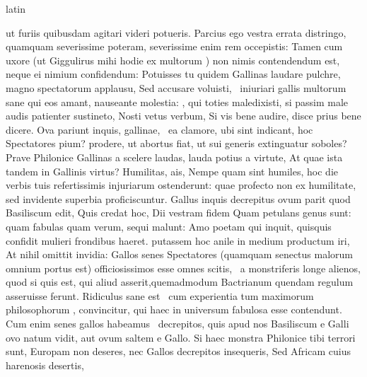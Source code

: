 \documentclass[12pt]{book}
\renewenvironment{latin}
    	{\begin{hyphenrules}{latin}}
    	{\end{hyphenrules}}
\begin{document}
\begin{pages}
\begin{latin}
\begin{Leftside}
                  ut furiis quibusdam agitari videri potueris. Parcius ego vestra errata distringo, quamquam severissime poteram, severissime enim rem occepistis: Tamen cum uxore (ut Giggulirus mihi
                  hodie ex multorum ) non nimis contendendum est, 
                  neque ei nimium confidendum: Potuisses tu quidem Gallinas laudare pulchre, magno spectatorum applausu, Sed accusare voluisti,  \ampersand\ iniuriari gallis multorum sane qui eos amant, nauseante molestia:
                  , qui toties maledixisti, si passim male audis patienter sustineto, Nosti vetus verbum, 
                  Si vis bene audire, disce prius bene dicere. Ova pariunt inquis, gallinae,  \ampersand\ ea clamore, ubi sint indicant,  hoc Spectatores pium?
                   prodere, ut abortus fiat, ut sui generis extinguatur soboles? Prave Philonice Gallinas a scelere laudas,  lauda potius a  virtute, 
                  At quae ista tandem in Gallinis virtus? Humilitas, ais, Nempe quam sint humiles, hoc die verbis tuis refertissimis injuriarum ostenderunt: quae profecto non ex humilitate,
                  sed invidente superbia proficiscuntur. Gallus inquis decrepitus ovum parit quod Basiliscum edit, Quis credat hoc, Dii vestram fidem Quam petulans genus  sunt: 
                  quam fabulas quam verum, sequi malunt: Amo poetam qui inquit, quisquis confidit mulieri frondibus haeret.  putassem hoc anile in medium productum iri, 
                  At nihil omittit invidia: Gallos senes Spectatores (quamquam senectus malorum omnium portus est) officiosissimos esse omnes scitis,  \ampersand\ a monstriferis  longe alienos, 
                  quod si quis est, qui aliud asserit,quemadmodum Bactrianum quendam regulum asseruisse ferunt. Ridiculus sane est  \ampersand\ cum experientia tum maximorum philosophorum , convincitur, 
                  qui haec in universum fabulosa esse contendunt. Cum enim senes gallos habeamus  \ampersand\ decrepitos, quis  apud nos Basiliscum e Galli ovo natum vidit, 
                  aut ovum saltem e Gallo. Si haec monstra Philonice tibi terrori sunt, Europam non deseres, nec Gallos decrepitos insequeris, Sed Africam cuius harenosis desertis, 

\end{Leftside}
\end{latin}
\end{pages}
\end{document}
